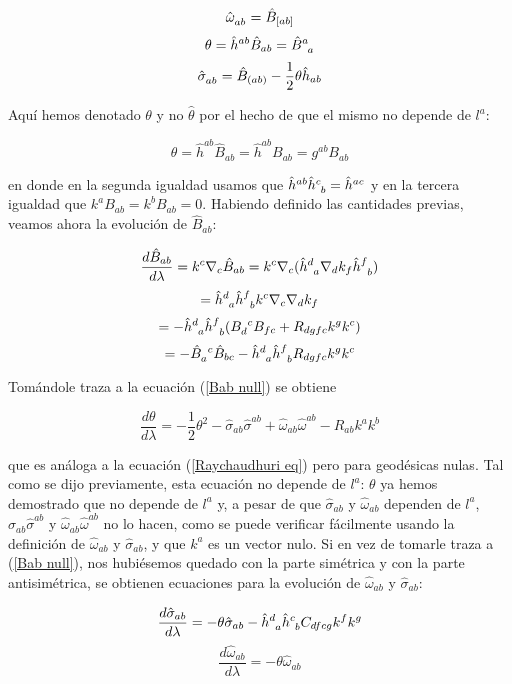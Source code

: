 $$
\tensor{\hat{\omega}}{_{ab}}=\hat{B}_{[ab]}
$$
$$
\theta=\hat{h}^{ab}\hat{B}_{ab}=\tensor{\hat{B}}{^a_a}
$$
$$
\tensor{\hat{\sigma}}{_{ab}}=\hat{B}_{(ab)}-\frac{1}{2}\theta\hat{h}_{ab}
$$

Aquí hemos denotado $\theta$ y no $\hat{\theta}$ por el hecho de que el mismo no depende de $l^a$: 

$$
\theta=\hat{h}^{ab}\hat{B}_{ab}=\hat{h}^{ab}B_{ab}=g^{ab}B_{ab}
$$

en donde en la segunda igualdad usamos que $\hat{h}^{ab}\tensor{\hat{h}}{^c_b}=\hat{h}^{ac}$ y en la tercera igualdad que $k^aB_{ab}=k^bB_{ab}=0$. Habiendo definido las cantidades previas, veamos ahora la evolución de $\hat{B}_{ab}$:

$$
\frac{d\hat{B}_{ab}}{d\lambda}=k^c\nabla_c\hat{B}_{ab}=k^c\nabla_c(\tensor{\hat{h}}{^d_a}\nabla_dk_f\tensor{\hat{h}}{^f_b})
$$
$$
=\tensor{\hat{h}}{^d_a}\tensor{\hat{h}}{^f_b}k^c\nabla_c\nabla_dk_f
$$
$$
=-\tensor{\hat{h}}{^d_a}\tensor{\hat{h}}{^f_b}(\tensor{B}{_d^c}B_{fc}+R_{dgfc}k^gk^c)
$$
\begin{equation}\label{Bab null}
=-\tensor{\hat{B}}{_a^c}\hat{B}_{bc}-\tensor{\hat{h}}{^d_a}\tensor{\hat{h}}{^f_b}R_{dgfc}k^gk^c
\end{equation}


Tomándole traza a la ecuación (\ref{Bab null}) se obtiene 

\begin{equation}\label{Raychaudhuri null}
\frac{d\theta}{d\lambda}=-\frac{1}{2}\theta^2-\hat{\sigma}_{ab}\hat{\sigma}^{ab}+\hat{\omega}_{ab}\hat{\omega}^{ab}-R_{ab}k^ak^b
\end{equation}

que es análoga a la ecuación (\ref{Raychaudhuri eq}) pero para geodésicas nulas. Tal como se dijo previamente, esta ecuación no depende de $l^a$: $\theta$ ya hemos demostrado que no depende de $l^a$ y, a pesar de que $\hat{\sigma}_{ab}$ y $\hat{\omega}_{ab}$ dependen de $l^a$, $\hat{\sigma}_{ab}\hat{\sigma}^{ab}$ y $\hat{\omega}_{ab}\hat{\omega}^{ab} $ no lo hacen, como se puede verificar fácilmente usando la definición de $\hat{\omega}_{ab}$ y $\hat{\sigma}_{ab}$, y que $k^a$ es un vector nulo. Si en vez de tomarle traza a (\ref{Bab null}), nos hubiésemos quedado con la parte simétrica y con la parte antisimétrica, se obtienen ecuaciones para la evolución de $\hat{\omega}_{ab}$ y $\hat{\sigma}_{ab}$:

$$
\frac{d\hat{\sigma}_{ab}}{d\lambda}=-\theta\hat{\sigma}_{ab}-\tensor{\hat{h}}{^d_a}\tensor{\hat{h}}{^c_b}C_{dfcg}k^fk^g
$$
$$
\frac{d\hat{\omega}_{ab}}{d\lambda}=-\theta\hat{\omega}_{ab}
$$

